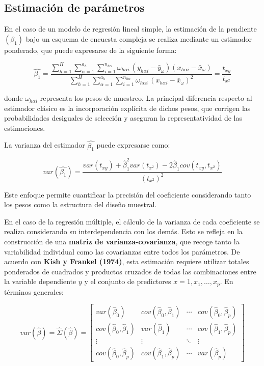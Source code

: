 \documentclass[
  spanish,
  12pt,
]{book}
\begin{document}
\subsection{Estimación de parámetros}\label{estimaciuxf3n-de-paruxe1metros}

En el caso de un modelo de regresión lineal simple, la estimación de la pendiente \((\beta_1)\) bajo un esquema de encuesta compleja se realiza mediante un estimador ponderado, que puede expresarse de la siguiente forma:

\[
\hat{\beta_{1}}  =  
\frac{\sum_{h=1}^H \sum_{\alpha=1}^{a_h} \sum_{i=1}^{n_{h\alpha}} \omega_{h\alpha i}\,(y_{h\alpha i}-\bar{y}_{\omega})(x_{h\alpha i}-\bar{x}_{\omega})}
{\sum_{h=1}^H \sum_{\alpha=1}^{a_h} \sum_{i=1}^{n_{h\alpha}} \omega_{h\alpha i}\,(x_{h\alpha i}-\bar{x}_{\omega})^{2}}
= \frac{t_{xy}}{t_{x^{2}}}
\]

donde \(\omega_{h\alpha i}\) representa los pesos de muestreo. La principal diferencia respecto al estimador clásico es la incorporación explícita de dichos pesos, que corrigen las probabilidades desiguales de selección y aseguran la representatividad de las estimaciones.

La varianza del estimador \(\hat{\beta_1}\) puede expresarse como:

\[
var\left(\hat{\beta_{1}}\right)  
=  \frac{var(t_{xy})+\hat{\beta}_{1}^{2}var(t_{x^{2}})-2\hat{\beta}_{1}cov(t_{xy},t_{x^{2}})}{(t_{x^{2}})^{2}}
\]

Este enfoque permite cuantificar la precisión del coeficiente considerando tanto los pesos como la estructura del diseño muestral.

En el caso de la regresión múltiple, el cálculo de la varianza de cada coeficiente se realiza considerando su interdependencia con los demás. Esto se refleja en la construcción de una \textbf{matriz de varianza-covarianza}, que recoge tanto la variabilidad individual como las covarianzas entre todos los parámetros. De acuerdo con \textbf{Kish y Frankel (1974)}, esta estimación requiere utilizar totales ponderados de cuadrados y productos cruzados de todas las combinaciones entre la variable dependiente \(y\) y el conjunto de predictores \(x = {1, x_1, …, x_p}\). En términos generales:

\[
var(\hat{\beta}) = \hat{\Sigma}(\hat{\beta}) =
\begin{bmatrix}
var(\hat{\beta}_{0}) & cov(\hat{\beta}_{0},\hat{\beta}_{1}) & \cdots & cov(\hat{\beta}_{0},\hat{\beta}_{p}) \\
cov(\hat{\beta}_{0},\hat{\beta}_{1}) & var(\hat{\beta}_{1}) & \cdots & cov(\hat{\beta}_{1},\hat{\beta}_{p}) \\
\vdots & \vdots & \ddots & \vdots \\
cov(\hat{\beta}_{0},\hat{\beta}_{p}) & cov(\hat{\beta}_{1},\hat{\beta}_{p}) & \cdots & var(\hat{\beta}_{p})
\end{bmatrix}
\]
\end{document}
